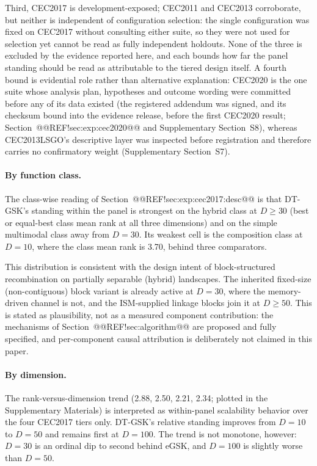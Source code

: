 \documentclass[10pt,a4paper]{article}
\newcommand{\dtgsk}{DT-GSK}
\newcommand{\egsk}{eGSK}
\begin{document}
Third, CEC2017 is
development-exposed; CEC2011 and CEC2013 corroborate, but neither is
independent of configuration selection: the single configuration was fixed on
CEC2017 without consulting either suite, so they were not used for selection yet
cannot be read as fully independent holdouts. None of the three is excluded by the
evidence reported here, and each bounds how far the panel standing should be
read as attributable to the tiered design itself. A fourth bound is
evidential role rather than alternative explanation: CEC2020 is the one
suite whose analysis plan, hypotheses and outcome wording were committed
before any of its data existed (the registered addendum was signed, and its
checksum bound into the evidence release, before the first CEC2020 result;
Section~@@REF!sec:exp:cec2020@@ and
Supplementary Section~S8), whereas CEC2013LSGO's descriptive layer was
inspected before registration and therefore carries no confirmatory
weight (Supplementary Section~S7).


\paragraph{By function class.}
The class-wise reading of
Section~@@REF!sec:exp:cec2017:desc@@ is that \dtgsk{}'s standing
within the panel is strongest on the hybrid class at $D \geq 30$
(best or equal-best class mean rank at all three dimensions) and on
the simple multimodal class away from $D = 30$. Its weakest cell is the
composition class at $D = 10$, where the class mean rank is 3.70, behind
three comparators.

This distribution is consistent with the design intent of
block-structured recombination on partially separable (hybrid)
landscapes. The inherited fixed-size (non-contiguous) block variant is
already active at $D = 30$, where the memory-driven channel is not, and the
ISM-supplied linkage blocks join it at $D \geq 50$. This is stated as
plausibility, not as a measured component contribution: the
mechanisms of
Section~@@REF!sec:algorithm@@ are proposed
and fully specified, and per-component causal attribution is
deliberately not claimed in this paper.


\paragraph{By dimension.}
The rank-versus-dimension trend (2.88,
2.50, 2.21, 2.34; plotted in the Supplementary Materials) is interpreted as
within-panel scalability behavior over the four CEC2017 tiers only.
\dtgsk{}'s relative standing
improves from $D = 10$ to $D = 50$ and remains first at $D = 100$.
The trend is not monotone, however: $D = 30$ is an ordinal dip to
second behind \egsk{}, and $D = 100$ is slightly worse than $D = 50$.
\end{document}
